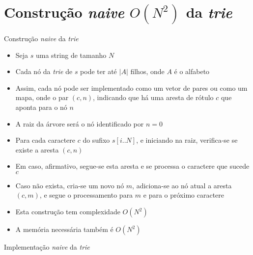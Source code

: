 \section{Construção {\it naive} $O(N^2)$ da {\it trie}}

\begin{frame}[fragile]{Construção {\it naive} da {\it trie}}

    \begin{itemize}
        \item Seja $s$ uma string de tamanho $N$
        \pause

        \item Cada nó da {\it trie} de $s$ pode ter até $|A|$ filhos, onde $A$ é o alfabeto
        \pause

        \item Assim, cada nó pode ser implementado como um vetor de pares ou como um mapa,
            onde o par $(c, n)$, indicando que há uma aresta de rótulo $c$ que aponta para o
            nó $n$
        \pause

        \item A raiz da árvore será o nó identificado por $n = 0$
        \pause

        \item Para cada caractere $c$ do sufixo $s[i..N]$, e iniciando na raiz,
            verifica-se se existe a aresta $(c, n)$
        \pause

        \item Em caso, afirmativo, segue-se esta aresta e se processa o caractere que sucede $c$
        \pause

        \item Caso não exista, cria-se um novo nó $m$, adiciona-se ao nó atual a aresta
            $(c, m)$, e segue o processamento para $m$ e para o próximo caractere
        \pause
    
        \item Esta construção tem complexidade $O(N^2)$
        \pause

        \item A memória necessária também é $O(N^2)$
    \end{itemize}

\end{frame}

\begin{frame}[fragile]{Implementação {\it naive} da {\it trie}}
\end{frame}

